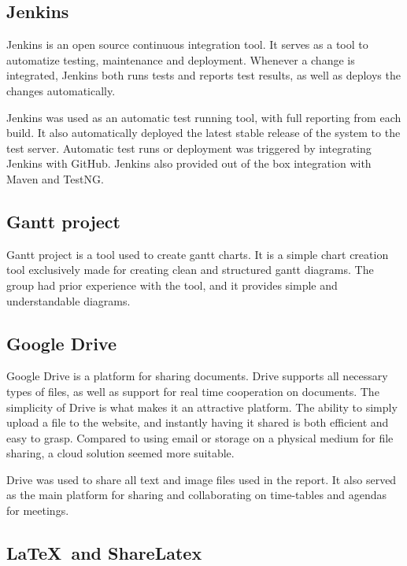 \subsection{Jenkins}
\label{subsec:prestudies-tools-jenkins}

Jenkins \cite{jenkins} is an open source continuous integration tool. It serves as a tool to automatize testing, maintenance and deployment. Whenever a change is integrated, Jenkins both runs tests and reports test results, as well as deploys the changes automatically.

Jenkins was used as an automatic test running tool, with full reporting from each build. It also automatically deployed the latest stable release of the system to the test server. Automatic test runs or deployment was triggered by integrating Jenkins with GitHub. Jenkins also provided out of the box integration with Maven and TestNG.

\subsection{Gantt project}
\label{subsec:prestudies-tools-gantt_project}

Gantt project \cite{gantt-project} is a tool used to create gantt charts. It is a simple chart creation tool exclusively made for creating clean and structured gantt diagrams. The group had prior experience with the tool, and it provides simple and understandable diagrams.

\subsection{Google Drive}
\label{subsec:prestudies-tools-google_drive}

Google Drive \cite{google-drive} is a platform for sharing documents. Drive supports all necessary types of files, as well as support for real time cooperation on documents. The simplicity of Drive is what makes it an attractive platform. The ability to simply upload a file to the website, and instantly having it shared is both efficient and easy to grasp. Compared to using email or storage on a physical medium for file sharing, a cloud solution seemed more suitable. 

Drive was used to share all text and image files used in the report. It also served as the main platform for sharing and collaborating on time-tables and agendas for meetings.

\subsection{LaTeX\ and ShareLatex}
\label{subsec:prestudies-tools-latex_and_sharelatex}

